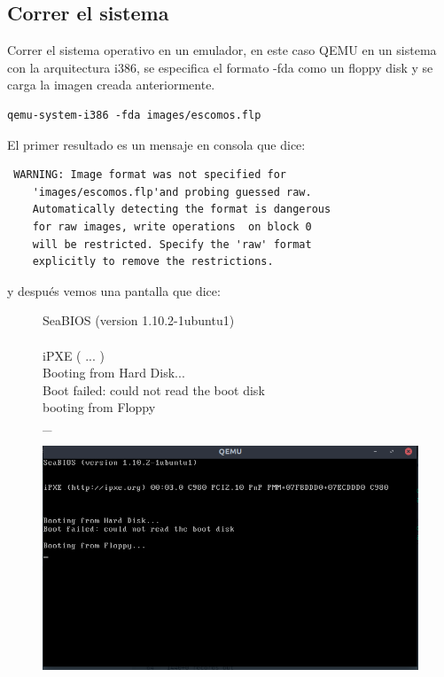 \documentclass[12pt]{article}
\begin{document}
\subsection{Correr el sistema}
Correr el sistema operativo en un emulador, en este caso QEMU en un sistema con la arquitectura i386, se especifica el formato -fda como un floppy disk y se carga la imagen creada anteriormente. 
\begin{verbatim}
qemu-system-i386 -fda images/escomos.flp 
\end{verbatim}
El primer resultado es un mensaje en consola que dice:
\begin{lstlisting}
 WARNING: Image format was not specified for 
    'images/escomos.flp'and probing guessed raw.
    Automatically detecting the format is dangerous
    for raw images, write operations  on block 0 
    will be restricted. Specify the 'raw' format
    explicitly to remove the restrictions. 
\end{lstlisting}
y después vemos una pantalla que dice:
\begin{figure}[!htb]
\begin{minipage}{0.5\textwidth}
SeaBIOS (version 1.10.2-1ubuntu1)\\\\
iPXE ( ... )\\
Booting from Hard Disk...\\
Boot failed: could not read the boot disk\\
booting from Floppy\\
\_
\end{minipage}
\begin{minipage}{0.5\textwidth}
\includegraphics{Prompt.png}
\end{minipage}
\end{figure}
\end{document}
